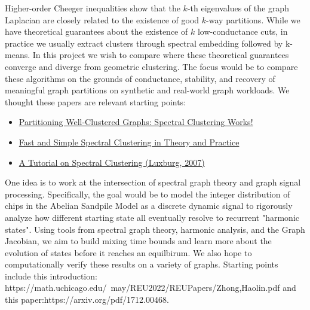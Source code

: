 \documentclass{article}
\begin{document}
Higher-order Cheeger inequalities show that the $k$-th eigenvalues of the graph Laplacian are closely related to the existence of good $k$-way partitions. While we have theoretical guarantees about the existence of \(k\) low-conductance cuts, in practice we usually extract clusters through spectral embedding followed by k-means. In this project we wish to compare where these theoretical guarantees converge and diverge from geometric clustering. The focus would be to compare these algorithms on the grounds of conductance, stability, and recovery of meaningful graph partitions on synthetic and real-world graph workloads. We thought these papers are relevant starting points: 
\begin{itemize}
    \item \href{https://arxiv.org/abs/1411.2021}{Partitioning Well-Clustered Graphs: Spectral Clustering Works!}
    \item \href{https://arxiv.org/abs/2310.10939}{Fast and Simple Spectral Clustering in Theory and Practice}
    \item \href{https://is.mpg.de/publications/4488}{A Tutorial on Spectral Clustering (Luxburg, 2007)}
\end{itemize}

One idea is to work at the intersection of spectral graph theory and graph signal processing. Specifically, the goal would be to model the integer distribution of chips in the Abelian Sandpile Model as a discrete dynamic signal to rigorously analyze how different starting state all eventually resolve to recurrent "harmonic states". Using tools from spectral graph theory, harmonic analysis, and the Graph Jacobian, we aim to build mixing time bounds and learn more about the evolution of states before it reaches an equilbirum. We also hope to computationally verify these results on a variety of graphs. Starting points include this introduction: https://math.uchicago.edu/~may/REU2022/REUPapers/Zhong,Haolin.pdf and this paper:https://arxiv.org/pdf/1712.00468.
\end{document}
